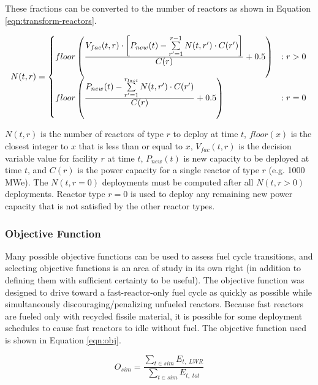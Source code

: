 These fractions can be converted to the number of reactors as shown in
Equation \ref{eqn:transform-reactors}.

\begin{equation}
    N(t, r) =
    \begin{cases}
        floor\left(\frac{
            \mathlarger{V_{fac}(t,r) \cdot \left[P_{new}(t) - \sum\limits_{r'=1}^{r-1} N(t,r') \cdot C(r')\right]}
        }{\mathlarger{C(r)}} + 0.5\right) & : r > 0 \\
        floor\left(\frac{
                \mathlarger{P_{new}(t) - \sum\limits_{r'=1}^{r_{last}} N(t,r') \cdot C(r')}
        }{\mathlarger{C(r)}} + 0.5\right) & : r = 0
    \end{cases}
    \label{eqn:transform-reactors}
\end{equation}

$N(t, r)$ is the number of reactors of type $r$ to deploy at time $t$,
$floor(x)$ is the closest integer to $x$ that is less than or equal to $x$,
$V_{fac}(t,r)$ is the decision variable value for facility $r$ at time $t$,
$P_{new}(t)$ is new capacity to be deployed at time $t$, and $C(r)$ is the
power capacity for a single reactor of type $r$ (e.g. 1000 MWe). The
$N(t,r=0)$ deployments must be computed after all $N(t, r > 0)$ deployments.
Reactor type $r=0$ is used to deploy any remaining new power capacity that is
not satisfied by the other reactor types.

\subsubsection{Objective Function}

Many possible objective functions can be used to assess fuel cycle
transitions, and selecting objective functions is an area of study in its own
right (in addition to defining them with sufficient certainty to be useful).
The objective function was designed to drive toward a fast-reactor-only fuel
cycle as quickly as possible while simultaneously discouraging/penalizing
unfueled reactors.  Because fast reactors are fueled only with recycled
fissile material, it is possible for some deployment schedules to cause fast
reactors to idle without fuel.  The objective function used is shown in
Equation \ref{eqn:obj}.

\begin{equation}
    \label{eqn:obj}
    O_{sim} = \frac{\sum\limits_{t \in sim} E_{t,\;LWR}}{\sum\limits_{t \in sim} E_{t,\;tot}}
\end{equation}

